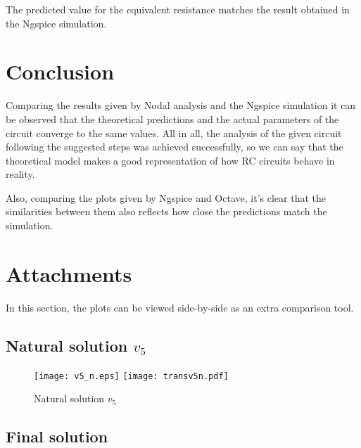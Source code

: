 The predicted value for the equivalent resistance matches the result obtained in the Ngspice simulation.

\section{Conclusion}
\label{sec:conclusion}
Comparing the results given by Nodal analysis and the Ngspice simulation it can be observed that the theoretical predictions and the actual parameters of the circuit converge to the same values. 
All in all, the analysis of the given circuit following the suggested steps was achieved successfully, so we can say that the theoretical model makes a good representation of how RC circuits behave in reality.  \par
Also, comparing the plots given by Ngspice and Octave, it's clear that the similarities between them also reflects how close the predictions match the simulation.


\section{Attachments}
\label{sec:attachments}

In this section, the plots can be viewed side-by-side as an extra comparison tool.

\subsection{Natural solution $v_5$}



\begin{figure}[h] \centering
\texttt{[image: v5\_n.eps]}
\texttt{[image: transv5n.pdf]}
\caption{Natural solution $v_5$}
\label{fig:comparison3}
\end{figure}
\FloatBarrier

\subsection{Final solution}

